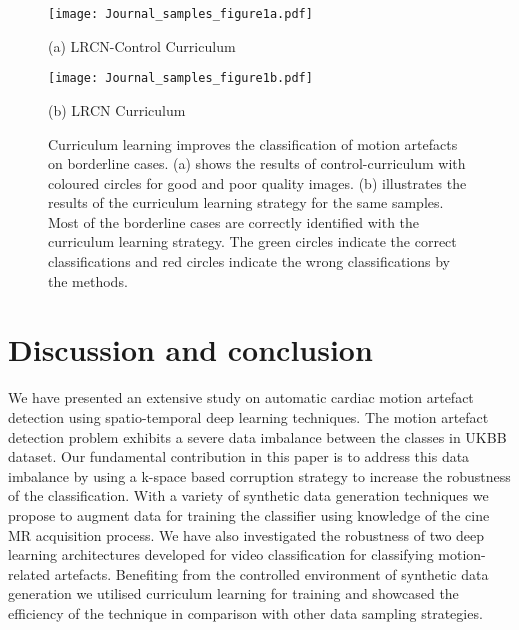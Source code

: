 \documentclass[preprint,12pt,authoryear]{elsarticle}
\begin{document}
 \begin{figure}

\begin{minipage}[b]{\linewidth}
  \centering
  \centerline{\texttt{[image: Journal\_samples\_figure1a.pdf]}}
  \centerline{(a) LRCN-Control Curriculum}\medskip
  \label{fig:Cursamplesa}
\end{minipage}
\hfill
\begin{minipage}[b]{\linewidth}
  \centering
  \centerline{\texttt{[image: Journal\_samples\_figure1b.pdf]}}
  \centerline{(b) LRCN Curriculum}\medskip
  \label{fig:Cursamplesb}
\end{minipage}
\hfill

\caption{Curriculum learning improves the classification of motion artefacts on borderline cases. (a) shows the results of control-curriculum with coloured circles for good and poor quality images.  (b) illustrates the results of the curriculum learning  strategy for the same samples. Most of the borderline cases are correctly identified with the curriculum learning strategy. The green circles indicate the correct classifications and red circles indicate the wrong classifications by the methods.}
\label{fig:Cursamples}
\end{figure}


\section{Discussion and conclusion}
\label{sec:discussion_conclusion}

We have presented an extensive study on automatic cardiac motion artefact detection using spatio-temporal deep learning techniques. The motion artefact detection problem exhibits a severe data imbalance between the classes in UKBB dataset. Our fundamental contribution in this paper is to address this data imbalance by using a k-space based corruption strategy to increase the robustness of the classification. With a variety of synthetic data generation techniques we propose to augment data for training the classifier using knowledge of the cine MR acquisition process. We have also investigated the robustness of two deep learning architectures developed for video classification for classifying motion-related artefacts.
Benefiting from the controlled environment of synthetic data generation we utilised curriculum learning for training and showcased the efficiency of the technique in comparison with other data sampling strategies. \\
\end{document}
